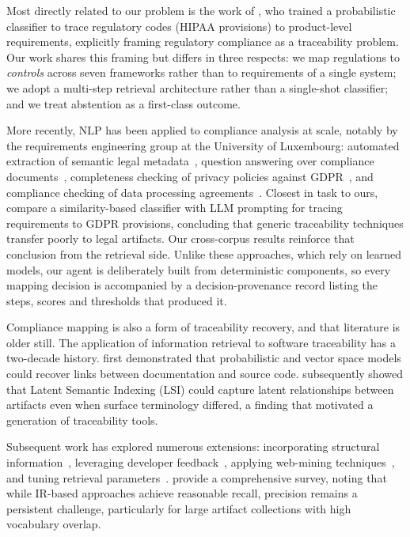 \documentclass[smallextended,natbib]{svjour3}
\begin{document}
Most directly related to our problem is the work of \citet{ClelandHuang2010}, who trained a probabilistic classifier to trace regulatory codes (HIPAA provisions) to product-level requirements, explicitly framing regulatory compliance as a traceability problem.
Our work shares this framing but differs in three respects: we map regulations to \emph{controls} across seven frameworks rather than to requirements of a single system; we adopt a multi-step retrieval architecture rather than a single-shot classifier; and we treat abstention as a first-class outcome.

More recently, NLP has been applied to compliance analysis at scale, notably by the requirements engineering group at the University of Luxembourg: automated extraction of semantic legal metadata~\citep{Sleimi2018}, question answering over compliance documents~\citep{Abualhaija2022}, completeness checking of privacy policies against GDPR~\citep{Amaral2022}, and compliance checking of data processing agreements~\citep{Cejas2023}.
Closest in task to ours, \citet{Etezadi2026} compare a similarity-based classifier with LLM prompting for tracing requirements to GDPR provisions, concluding that generic traceability techniques transfer poorly to legal artifacts. Our cross-corpus results reinforce that conclusion from the retrieval side.
Unlike these approaches, which rely on learned models, our agent is deliberately built from deterministic components, so every mapping decision is accompanied by a decision-provenance record listing the steps, scores and thresholds that produced it.

Compliance mapping is also a form of traceability recovery, and that literature is older still.
The application of information retrieval to software traceability has a two-decade history.
\citet{Antoniol2002} first demonstrated that probabilistic and vector space models could recover links between documentation and source code.
\citet{MarcusMaletic2003} subsequently showed that Latent Semantic Indexing (LSI) could capture latent relationships between artifacts even when surface terminology differed, a finding that motivated a generation of traceability tools.

Subsequent work has explored numerous extensions: incorporating structural information~\citep{McMillan2009}, leveraging developer feedback~\citep{Cuddeback2010}, applying web-mining techniques~\citep{Ali2013}, and tuning retrieval parameters~\citep{Oliveto2010}.
\citet{Borg2014} provide a comprehensive survey, noting that while IR-based approaches achieve reasonable recall, precision remains a persistent challenge, particularly for large artifact collections with high vocabulary overlap.
\end{document}
